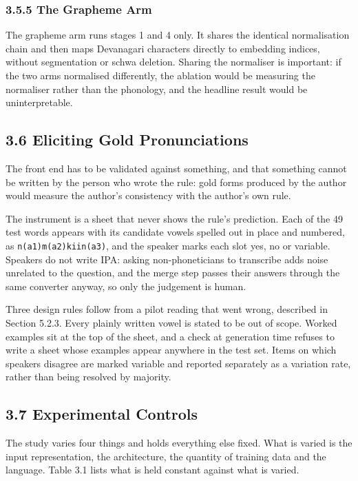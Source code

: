\documentclass[12pt,a4paper]{article}
\begin{document}
\subsubsection*{3.5.5  The Grapheme Arm}
The grapheme arm runs stages 1 and 4 only. It shares the identical normalisation chain and then maps Devanagari characters directly to embedding indices, without segmentation or schwa deletion. Sharing the normaliser is important: if the two arms normalised differently, the ablation would be measuring the normaliser rather than the phonology, and the headline result would be uninterpretable.

\subsection*{3.6  Eliciting Gold Pronunciations}
The front end has to be validated against something, and that something cannot be written by the person who wrote the rule: gold forms produced by the author would measure the author's consistency with the author's own rule.

The instrument is a sheet that never shows the rule's prediction. Each of the 49 test words appears with its candidate vowels spelled out in place and numbered, as \texttt{n(a1)m(a2)kiin(a3)}, and the speaker marks each slot yes, no or variable. Speakers do not write IPA: asking non-phoneticians to transcribe adds noise unrelated to the question, and the merge step passes their answers through the same converter anyway, so only the judgement is human.

Three design rules follow from a pilot reading that went wrong, described in Section 5.2.3. Every plainly written vowel is stated to be out of scope. Worked examples sit at the top of the sheet, and a check at generation time refuses to write a sheet whose examples appear anywhere in the test set. Items on which speakers disagree are marked variable and reported separately as a variation rate, rather than being resolved by majority.

\subsection*{3.7  Experimental Controls}
The study varies four things and holds everything else fixed. What is varied is the input representation, the architecture, the quantity of training data and the language. Table 3.1 lists what is held constant against what is varied.
\end{document}
